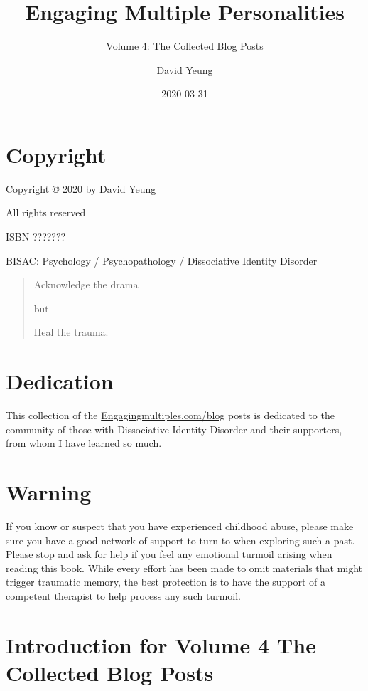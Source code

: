 \documentclass[]{book}
\title{Engaging Multiple Personalities}
\subtitle{Volume 4: The Collected Blog Posts}
\author{David Yeung}
\date{2020-03-31}
\begin{document}
\maketitle

{
\setcounter{tocdepth}{1}
\tableofcontents
}
\hypertarget{copyright}{%
\chapter*{Copyright}\label{copyright}}

Copyright © 2020
by David Yeung

All rights reserved

ISBN ???????

BISAC: Psychology / Psychopathology / Dissociative Identity Disorder

\begin{quote}
Acknowledge the drama

but

Heal the trauma.
\end{quote}

\hypertarget{dedication}{%
\chapter*{Dedication}\label{dedication}}

This collection of the \href{https://www.engagingmultiples.com/blog/}{Engagingmultiples.com/blog} posts is dedicated to the community of those with Dissociative Identity Disorder and their supporters, from whom I have learned so much.

\hypertarget{warning}{%
\chapter*{Warning}\label{warning}}

If you know or suspect that you have experienced childhood abuse, please make sure you have a good network of support to turn to when exploring such a past. Please stop and ask for help if you feel any emotional turmoil arising when reading this book. While every effort has been made to omit materials that might trigger traumatic memory, the best protection is to have the support of a competent therapist to help process any such turmoil.

\hypertarget{introduction-for-volume-4-the-collected-blog-posts}{%
\chapter*{Introduction for Volume 4 The Collected Blog Posts}\label{introduction-for-volume-4-the-collected-blog-posts}}
\end{document}

